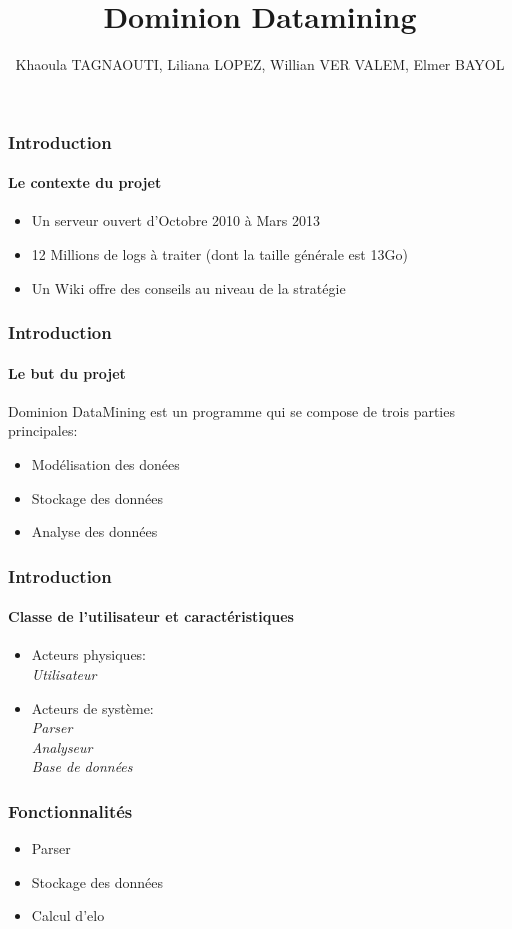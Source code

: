 \documentclass{beamer}
\title{Dominion Datamining}
\author{Khaoula TAGNAOUTI, Liliana LOPEZ, Willian VER VALEM, Elmer BAYOL}
\begin{document}
\maketitle

\begin{frame}
  \frametitle{Introduction}
  \framesubtitle{Le contexte du projet}
  
  \begin{itemize}
  \item Un serveur ouvert d'Octobre 2010 à Mars 2013
    \item 12 Millions de logs à traiter (dont la taille générale est 13Go)
    \item Un Wiki offre des conseils au niveau de la stratégie
  
  \end{itemize}
\end{frame}
  
  \begin{frame}
  \frametitle{Introduction}
  \framesubtitle{Le but du projet}
  Dominion DataMining est un programme qui se compose de trois parties principales:
  \begin{itemize}
  \item Modélisation des donées
  \item Stockage des données
  \item Analyse des données
  \end{itemize}
\end{frame}

\begin{frame}
  \frametitle{Introduction}
  \framesubtitle{Classe de l'utilisateur et caractéristiques}
 
  \begin{itemize}
    \item Acteurs physiques:
     ~~\\
     \textit{Utilisateur}
      ~~\\
    \item Acteurs de système:  
      ~~\\
     \textit{Parser}
       ~~\\
     \textit{Analyseur}
      ~~\\
     \textit{Base de données}
      ~~\\
     
  \end{itemize}

\end{frame}
  

\begin{frame}
  \frametitle{Fonctionnalités}
  \begin{itemize}
  \item Parser
  \item Stockage des données
  \item Calcul d'elo
  \end{itemize}
\end{frame}
\end{document}
